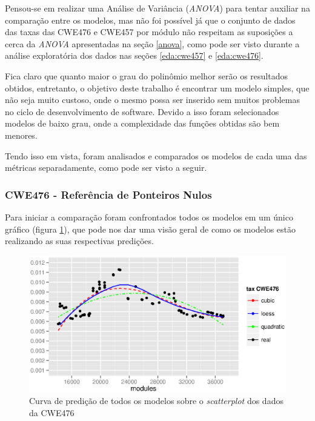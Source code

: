 Pensou-se em realizar uma Análise de Variância (\textit{ANOVA}) para tentar
auxiliar na comparação entre os modelos, mas não foi possível já que o conjunto
de dados das taxas das CWE476 e CWE457 por módulo não respeitam as suposições a
cerca da \textit{ANOVA} apresentadas na seção \ref{anova}, como pode ser visto
durante a análise exploratória dos dados nas seções \ref{eda:cwe457} e
\ref{eda:cwe476}.

Fica claro que quanto maior o grau do polinômio melhor serão os resultados
obtidos, entretanto, o objetivo deste trabalho é encontrar um modelo simples,
que não seja muito custoso, onde o mesmo possa ser inserido sem muitos problemas
no ciclo de desenvolvimento de software. Devido a isso foram selecionados
modelos de baixo grau, onde a complexidade das funções obtidas são bem menores.

Tendo isso em vista, foram analisados e comparados os modelos de cada uma das
métricas separadamente, como pode ser visto a seguir.

\subsubsection{CWE476 - Referência de Ponteiros Nulos}\label{comparacaocwe476}

Para iniciar a comparação foram confrontados todos os modelos em um único
gráfico (figura \ref{fig:cwe476-all-models}), que pode nos dar uma visão geral de
como os modelos estão realizando as suas respectivas predições.

\begin{figure}[h]
  \centering
  \includegraphics[width=1.0\textwidth]
      {figuras/cwe476-all-models.eps}
      \caption{Curva de predição de todos os modelos sobre o \textit{scatterplot}
      dos dados da CWE476}
  \label{fig:cwe476-all-models}
\end{figure}

